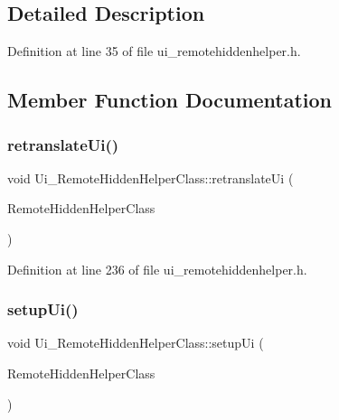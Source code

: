 \subsection{Detailed Description}


Definition at line 35 of file ui\+\_\+remotehiddenhelper.\+h.



\subsection{Member Function Documentation}
\hypertarget{class_ui___remote_hidden_helper_class_a393b3811be6e056a98239ede71c80ec9}{}\label{class_ui___remote_hidden_helper_class_a393b3811be6e056a98239ede71c80ec9} 
\subsubsection{\texorpdfstring{retranslate\+Ui()}{retranslateUi()}}
{\footnotesize\ttfamily void Ui\+\_\+\+Remote\+Hidden\+Helper\+Class\+::retranslate\+Ui (\begin{DoxyParamCaption}\item[{Q\+Main\+Window $\ast$}]{Remote\+Hidden\+Helper\+Class }\end{DoxyParamCaption})\hspace{0.3cm}{\ttfamily [inline]}}



Definition at line 236 of file ui\+\_\+remotehiddenhelper.\+h.

\hypertarget{class_ui___remote_hidden_helper_class_acdd6f5a5bebf921d5fcec8489a3fff1e}{}\label{class_ui___remote_hidden_helper_class_acdd6f5a5bebf921d5fcec8489a3fff1e} 
\subsubsection{\texorpdfstring{setup\+Ui()}{setupUi()}}
{\footnotesize\ttfamily void Ui\+\_\+\+Remote\+Hidden\+Helper\+Class\+::setup\+Ui (\begin{DoxyParamCaption}\item[{Q\+Main\+Window $\ast$}]{Remote\+Hidden\+Helper\+Class }\end{DoxyParamCaption})\hspace{0.3cm}{\ttfamily [inline]}}



